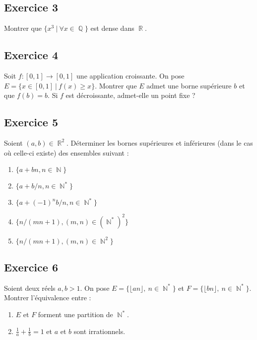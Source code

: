 \documentclass{article}
\DeclareMathOperator{\R}{\mathbb{R}}
\DeclareMathOperator{\N}{\mathbb{N}}
\DeclareMathOperator{\Q}{\mathbb{Q}}
\begin{document}
\subsection*{Exercice 3} 

Montrer que $\{x^3 \ | \ \forall x \in \Q \}$ est dense dans $\R$. 

\subsection*{Exercice 4} 

Soit $f : [0, 1] \to [0, 1]$ une application croissante. On pose $E = \{ x\in [0, 1] \ | \ f(x) \geqslant x \}$. Montrer que $E$ admet une borne supérieure $b$ et que $f(b) = b$. Si $f$ est décroissante, admet-elle un point fixe ? 

\subsection*{Exercice 5} 

Soient $(a, b) \in \R^2$. Déterminer les bornes supérieures et inférieures (dans le cas où celle-ci existe) des ensembles suivant : 

\begin{enumerate}
    \item $\{ a + bn, n\in \N\}$ 
    \item $\{ a + b/n, n\in \N^*\}$ 
    \item $\{ a + (-1)^n b/n, n\in \N^*\}$ 
    \item $\{ n/(mn+1), (m,n)\in (\N^*)^2\}$ 
    \item $\{ n/(mn+1), (m,n)\in \N^2\}$    
\end{enumerate}


\subsection*{Exercice 6} 

Soient deux réels $a, b > 1$. On pose $E = \{ \lfloor an \rfloor , \ n \in \N^* \}$ et $F = \{ \lfloor bn \rfloor , \ n \in \N^* \} $. Montrer l'équivalence entre : 

\begin{enumerate}
    \item $E$ et $F$ forment une partition de $\N^*$. 
    \item $\displaystyle\frac{1}{a} + \frac{1}{b} = 1$ et $a$ et $b$ sont irrationnels. 
\end{enumerate}
\end{document}
